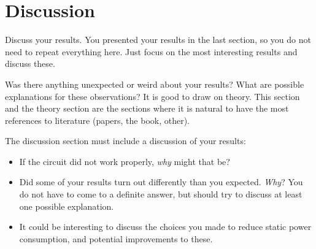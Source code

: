 \section{Discussion}
\label{sec: Discussion}

Discuss your results. You presented your results in the last section, so you do not need to repeat everything here. Just focus on the most interesting results and discuss these.

Was there anything unexpected or weird about your results? What are possible explanations for these observations? It is good to draw on theory. This section and the theory section are the sections where it is natural to have the most references to literature (papers, the book, other).

The discussion section must include a discussion of your results:
\begin{itemize}
    \item If the circuit did not work properly, \textit{why} might that be? 
    \item Did some of your results turn out differently than you expected. \textit{Why}? You do not have to come to a definite answer, but should try to discuss at least one possible explanation.
    \item It could be interesting to discuss the choices you made to reduce static power consumption, and potential improvements to these.
\end{itemize}